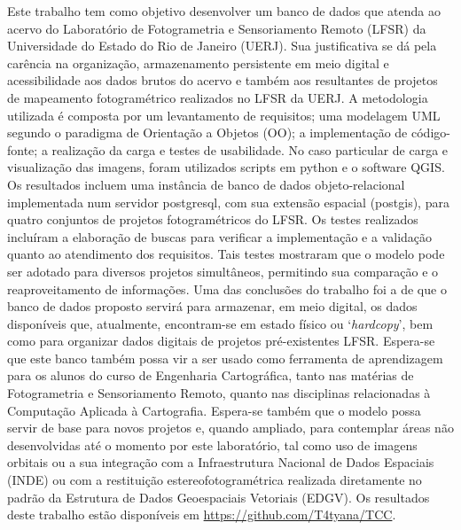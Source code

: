 
\fazreferencia


Este trabalho tem como objetivo desenvolver um banco de dados que atenda ao acervo do Laboratório de Fotogrametria e Sensoriamento Remoto (LFSR) da Universidade do Estado do Rio de Janeiro (UERJ).
Sua justificativa se dá pela carência na organização, armazenamento persistente em meio digital e acessibilidade aos dados brutos do acervo e também aos resultantes de projetos de mapeamento fotogramétrico realizados no LFSR da UERJ.
A metodologia utilizada é composta por um levantamento de requisitos; uma modelagem UML segundo o paradigma de Orientação a Objetos (OO); a implementação de código-fonte; a realização da carga e testes de usabilidade. No caso particular de carga e visualização das imagens, foram utilizados scripts em python e o software QGIS.
Os resultados incluem uma instância de banco de dados objeto-relacional implementada num servidor postgresql, com sua extensão espacial (postgis), para quatro conjuntos de projetos fotogramétricos do LFSR. Os testes realizados incluíram a elaboração de buscas para verificar a implementação e a validação quanto ao atendimento dos requisitos. Tais testes mostraram que o modelo pode ser adotado para diversos projetos simultâneos, permitindo sua comparação e o reaproveitamento de informações.
Uma das conclusões do trabalho foi a de que o banco de dados proposto servirá para armazenar, em meio digital, os dados disponíveis que, atualmente, encontram-se em estado físico ou `\textit{hardcopy}', bem como para organizar dados digitais de projetos pré-existentes LFSR. Espera-se que este banco também possa vir a ser usado como ferramenta de aprendizagem para os alunos do curso de Engenharia Cartográfica, tanto nas matérias de Fotogrametria e Sensoriamento Remoto, quanto nas disciplinas relacionadas à Computação Aplicada à Cartografia.
Espera-se também que o modelo possa servir de base para novos projetos e, quando ampliado, para contemplar áreas não desenvolvidas até o momento por este laboratório, tal como uso de imagens orbitais ou a sua integração com a Infraestrutura Nacional de Dados Espaciais (INDE) ou com a restituição estereofotogramétrica realizada diretamente no padrão da Estrutura de Dados Geoespaciais Vetoriais (EDGV).
Os resultados deste trabalho estão disponíveis em \url{https://github.com/T4tyana/TCC}.
 
\imprimirchaves